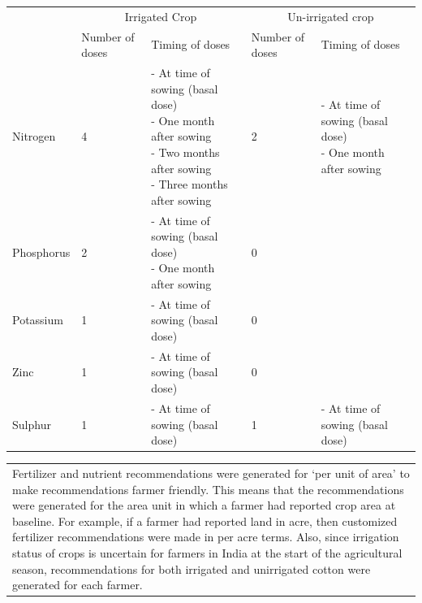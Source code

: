 \documentclass{article}
\begin{document}
\begin{table}[!htb]
\begin{tabularx}{\linewidth}{X}
\end{tabularx}
\begin{tabularx}{\linewidth}{llX|lX}
 & \multicolumn{2}{c}{Irrigated Crop} & \multicolumn{2}{c}{Un-irrigated crop} \\
\cmidrule(l{2pt}r{2pt}){2-3} \cmidrule(l{2pt}r{2pt}){4-5} 
 & Number of doses & Timing of doses & Number of doses & Timing of doses \\
Nitrogen & 4 & \makecell[l]{- At time of sowing (basal dose) \\ - One month after sowing \\ - Two months after sowing \\ - Three months after sowing} & 2 & \makecell[l]{- At time of sowing (basal dose) \\ - One month after sowing} \\
Phosphorus & 2 & \makecell[l]{- At time of sowing (basal dose) \\ - One month after sowing} & 0 & \\
Potassium & 1 & - At time of sowing (basal dose) & 0 & \\
Zinc & 1 & - At time of sowing (basal dose) & 0 & \\
Sulphur & 1 & - At time of sowing (basal dose) & 1 & - At time of sowing (basal dose)
\end{tabularx}
\begin{tabularx}{\linewidth}{X}
\hline 
Fertilizer and nutrient recommendations were generated for ‘per unit of area’ to make recommendations farmer friendly. This means that the recommendations were generated for the area unit  in which a farmer had reported crop area at baseline. For example, if a farmer had reported land in acre, then customized fertilizer recommendations were made in per acre terms. Also, since irrigation status of crops is uncertain for farmers in India at the start of the agricultural season, recommendations for both irrigated and unirrigated cotton were generated for each farmer.  \\ 
\end{tabularx}
\end{table}

\FloatBarrier

\pagebreak
\clearpage

\FloatBarrier
\end{document}
